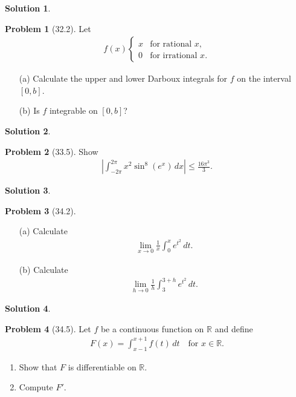\documentclass[12pt]{article}
\theoremstyle{definition} %
\newtheorem{solution}{Solution}
\newtheorem{problem}{Problem}
\theoremstyle{plain} %
\begin{document}
\begin{solution}
    
\end{solution}
\begin{problem}[32.2]
    Let
    \begin{align}
        f(x)\begin{cases} 
            x & \text{for rational } x, \\
            0 & \text{for irrational } x.
        \end{cases}
    \end{align}
    \begin{enumerate}
        \item[(a)] Calculate the upper and lower Darboux integrals for $ f $ on the interval $[0, b]$.
        \item[(b)] Is $ f $ integrable on $[0, b]$?
    \end{enumerate}
\end{problem}
\begin{solution}
    
\end{solution}
\begin{problem}[33.5]
    Show
    \begin{align}
         \left| \int_{-2\pi}^{2\pi} x^2 \sin^8(e^x) \, dx \right| \leq \frac{16\pi^3}{3}.
    \end{align}
\end{problem}
\begin{solution}
    
\end{solution}
\begin{problem}[34.2]
    \begin{enumerate}
        \item[(a)] Calculate 
        \begin{align}
            \lim_{x \to 0} \frac{1}{x} \int_{0}^{x} e^{t^2} \, dt.
        \end{align}
        \item[(b)] Calculate 
        \begin{align}
            \lim_{h \to 0} \frac{1}{h} \int_{3}^{3+h} e^{t^2} \, dt.
        \end{align}
    \end{enumerate}
\end{problem}
\begin{solution}
    
\end{solution}
\begin{problem}[34.5]
    Let $f$ be a continuous function on $\mathbb{R}$ and define
    \begin{align}
        F(x) = \int_{x-1}^{x+1} f(t) \, dt \quad \text{for } x \in \mathbb{R}.
    \end{align}
    \begin{enumerate}
        \item Show that $ F $ is differentiable on $ \mathbb{R} $.
        \item Compute $ F' $.
    \end{enumerate}
\end{problem}
\end{document}
